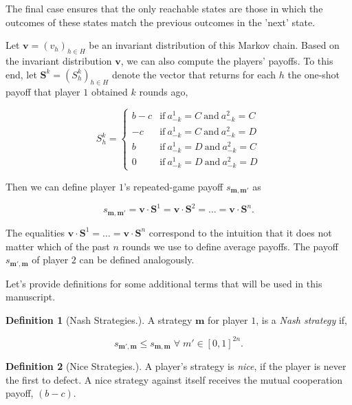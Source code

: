 \documentclass{article}
\theoremstyle{definition}
\newtheorem{definition}{Definition}[section]
\begin{document}
The final case ensures that the only reachable states are those in which the
outcomes of these states match the previous outcomes in the 'next' state.

Let $\mathbf{v}=(v_h)_{h\in H}$ be an invariant distribution of this Markov
chain. Based on the invariant distribution $\mathbf{v}$, we can also compute the
players' payoffs. To this end, let $\mathbf{S}^k = (S_h^k)_{h\in H}$ denote the
vector that returns for each $h$ the one-shot payoff that player $1$ obtained
$k$ rounds ago,

\begin{equation}
    S_h^k = \left\{
    \begin{array}{cl}
    b-c	&\text{if}~ a_{-k}^1=C~\text{and}~ a_{-k}^2=C\\
    -c	&\text{if}~ a_{-k}^1=C~\text{and}~ a_{-k}^2=D\\
    b	&\text{if}~ a_{-k}^1=D~\text{and}~ a_{-k}^2=C\\
    0	&\text{if}~ a_{-k}^1=D~\text{and}~ a_{-k}^2=D
    \end{array}
    \right.
\end{equation}

Then we can define player $1$'s repeated-game payoff $s_{\mathbf{m},\mathbf{m'}}$ as

\begin{equation} \label{Eq:Payoff}
s_{\mathbf{m},\mathbf{m'}}  = \mathbf{v}\cdot \mathbf{S}^1 = \mathbf{v}\cdot \mathbf{S}^2 = \ldots = \mathbf{v} \cdot \mathbf{S}^n.
\end{equation}

The equalities $\mathbf{v}\cdot \mathbf{S}^1 = \ldots = \mathbf{v} \cdot
\mathbf{S}^n$ correspond to the intuition that it does not matter which of the
past $n$ rounds we use to define average payoffs. The payoff
$s_{\mathbf{m'},\mathbf{m}}$ of player $2$ can be defined analogously.

Let's provide definitions for some additional terms that will be used in this
manuscript.

\begin{definition}[Nash Strategies.]
A strategy $\mathbf{m}$ for player $1$, is a \textit{Nash
strategy} if,

\begin{equation}\label{Eq:Nash}
    s_{\mathbf{m'},\mathbf{m}} \leq s_{\mathbf{m},\mathbf{m}} \;\forall \; m' \in [0, 1]^{2n}.
\end{equation}
\end{definition}

\begin{definition}[Nice Strategies.] A player's strategy is \textit{nice}, if
the player is never the first to defect. A nice strategy against itself receives
the mutual cooperation payoff, $(b - c)$.
\end{definition}
\end{document}
